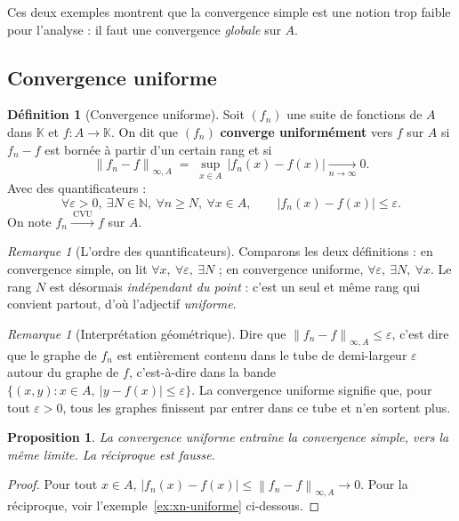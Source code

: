 \documentclass[11pt,a4paper]{article}
\theoremstyle{plain}
\newtheorem{proposition}[theoreme]{Proposition}
\theoremstyle{definition}
\newtheorem{definition}[theoreme]{Définition}
\theoremstyle{remark}
\newtheorem{remarque}[theoreme]{Remarque}
\newcommand{\N}{\mathbb{N}}
\newcommand{\K}{\mathbb{K}}
\newcommand{\eps}{\varepsilon}
\newcommand{\Ninf}[2]{\left\lVert #1 \right\rVert_{\infty,#2}}
\numberwithin{equation}{section}
\begin{document}
Ces deux exemples montrent que la convergence simple est une notion trop
faible pour l'analyse : il faut une convergence \emph{globale} sur $A$.

\subsection{Convergence uniforme}

\begin{definition}[Convergence uniforme]
Soit $(f_n)$ une suite de fonctions de $A$ dans $\K$ et $f:A\to\K$. On dit
que $(f_n)$ \textbf{converge uniformément} vers $f$ sur $A$ si $f_n-f$ est
bornée à partir d'un certain rang et si
\[
    \Ninf{f_n-f}{A} \;=\; \sup_{x\in A}\,\lvert f_n(x)-f(x)\rvert
    \xrightarrow[n\to\infty]{} 0 .
\]
Avec des quantificateurs :
\[
    \forall \eps>0,\ \exists N\in\N,\ \forall n\geq N,\ \forall x\in A,
    \qquad \lvert f_n(x)-f(x)\rvert \leq \eps .
\]
On note $f_n \xrightarrow{\ \mathrm{CVU}\ } f$ sur $A$.
\end{definition}

\begin{remarque}[L'ordre des quantificateurs]
Comparons les deux définitions : en convergence simple, on lit
$\forall x,\ \forall\eps,\ \exists N$ ; en convergence uniforme,
$\forall\eps,\ \exists N,\ \forall x$. Le rang $N$ est désormais
\emph{indépendant du point} : c'est un seul et même rang qui convient
partout, d'où l'adjectif \emph{uniforme}.
\end{remarque}

\begin{remarque}[Interprétation géométrique]
Dire que $\Ninf{f_n-f}{A}\leq\eps$, c'est dire que le graphe de $f_n$ est
entièrement contenu dans le \og tube \fg{} de demi-largeur $\eps$ autour du
graphe de $f$, c'est-à-dire dans la bande
$\{(x,y) : x\in A,\ \lvert y-f(x)\rvert\leq\eps\}$. La convergence uniforme
signifie que, pour tout $\eps>0$, tous les graphes finissent par entrer dans
ce tube et n'en sortent plus.
\end{remarque}

\begin{proposition}\label{prop:cvu-cvs}
La convergence uniforme entraîne la convergence simple, vers la même limite.
La réciproque est fausse.
\end{proposition}

\begin{proof}
Pour tout $x\in A$, $\lvert f_n(x)-f(x)\rvert \leq \Ninf{f_n-f}{A} \to 0$.
Pour la réciproque, voir l'exemple~\ref{ex:xn-uniforme} ci-dessous.
\end{proof}
\end{document}
